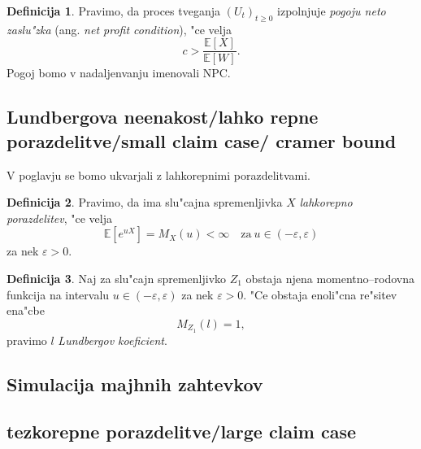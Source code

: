 \documentclass[12pt, a4paper, reqno]{amsart}
\theoremstyle{definition} %
\newtheorem{definicija}{Definicija}[section]
\theoremstyle{plain} %
\newcommand{\E}{\mathbb{E}}
\newcommand{\1}{\mathds{1}}
\begin{document}
        \begin{definicija}
            Pravimo, da proces tveganja $(U_t)_{t\geq0}$ izpolnjuje \textit{pogoju neto zaslu"zka}
            (ang. \textit{net profit condition}), "ce velja 
            \begin{equation*}
                c > \frac{\E\left[X\right]}{\E\left[W\right]}.
            \end{equation*}
            Pogoj bomo v nadaljenvanju imenovali NPC.
            \label{def:NPC}
        \end{definicija}
    
    \subsection{Lundbergova neenakost/lahko repne porazdelitve/small claim case/ cramer bound}

        V poglavju se bomo ukvarjali z lahkorepnimi porazdelitvami.
        \begin{definicija}
            Pravimo, da ima slu"cajna spremenljivka $X$ \textit{lahkorepno porazdelitev}, "ce velja
        \begin{equation*}
            \E\left[e^{uX}\right] = M_X(u) < \infty \quad \text{za} \ u \in (-\varepsilon, \varepsilon)
        \end{equation*}
        za nek $\varepsilon > 0$.
        \label{def:lahkorepnaPorazdelitev}
        \end{definicija}

        \begin{definicija}
            Naj za slu"cajn spremenljivko $Z_1$ obstaja njena momentno--rodovna funkcija 
            na intervalu $u\in(-\varepsilon, \varepsilon)$  za nek $\varepsilon > 0$. "Ce obstaja 
            enoli"cna re"sitev ena"cbe
            \begin{equation*}
                M_{Z_1}(l)  = 1,
            \end{equation*}
            pravimo $l$ \textit{Lundbergov koeficient}.
        \end{definicija}


    \subsection{Simulacija majhnih zahtevkov}


    \subsection{tezkorepne porazdelitve/large claim case}
\end{document}
